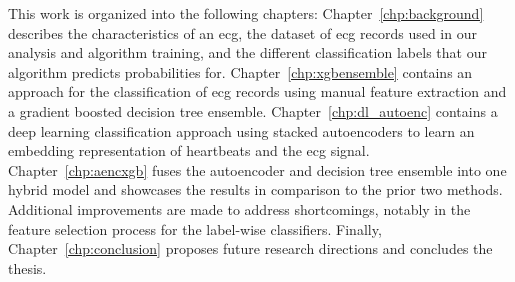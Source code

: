 \documentclass[\main/thesis.tex]{subfiles}
\begin{document}
This work is organized into the following chapters:
Chapter~\ref{chp:background} describes the characteristics of an \gls{ecg}, the dataset of \gls{ecg} records used in our analysis and algorithm training, and the different classification labels that our algorithm predicts probabilities for.
Chapter~\ref{chp:xgbensemble} contains an approach for the classification of \gls{ecg} records using manual feature extraction and a gradient boosted decision tree ensemble.
Chapter~\ref{chp:dl_autoenc} contains a deep learning classification approach using stacked autoencoders to learn an embedding representation of heartbeats and the \gls{ecg} signal.
Chapter~\ref{chp:aencxgb} fuses the autoencoder and decision tree ensemble into one hybrid model and showcases the results in comparison to the prior two methods. Additional improvements are made to address shortcomings, notably in the feature selection process for the label-wise classifiers.
Finally, Chapter~\ref{chp:conclusion} proposes future research directions and concludes the thesis.










\end{document}

